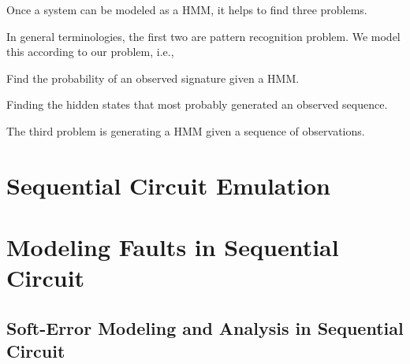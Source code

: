 Once a system can be modeled as a HMM, it helps to find three problems.

In general terminologies, the first two are pattern recognition problem. We model this according to our problem, i.e.,

\begin{tcolorbox}[width=\textwidth,colback={gray},title={Evaluation },colbacktitle=gray,coltitle=black]  

Find the probability of an observed signature given a HMM.  
\end{tcolorbox}


\begin{tcolorbox}[width=\textwidth,colback={gray},title={Decoding },colbacktitle=gray,coltitle=black]  

Finding the hidden states that most probably generated an observed sequence. 
\end{tcolorbox}

\begin{tcolorbox}[width=\textwidth,colback={gray},title={Learning },colbacktitle=gray,coltitle=black]  

The third problem is generating a HMM given a sequence of observations.
\end{tcolorbox}

\section{Sequential Circuit Emulation}



\section{Modeling Faults in Sequential Circuit}
\subsection{Soft-Error Modeling and Analysis in Sequential Circuit}


